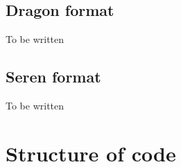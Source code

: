 \documentclass[a4paper]{article}
\begin{document}
\subsection{Dragon format}
To be written

\subsection{Seren format}
To be written




\section{Structure of code}


\end{document}

